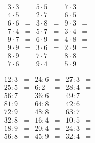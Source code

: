 \documentclass[12pt, a4paper]{article}
\begin{document}
\begin{align*}
3\cdot3 &=& 5\cdot5 &=& 7\cdot3 &=\\
4\cdot5 &=& 2\cdot7 &=& 6\cdot5 &=\\
6\cdot6 &=& 3\cdot8 &=& 9\cdot3 &=\\
7\cdot4 &=& 5\cdot7 &=& 3\cdot4 &=\\
9\cdot7 &=& 6\cdot9 &=& 4\cdot8 &=\\
9\cdot9 &=& 3\cdot6 &=& 2\cdot9 &=\\
8\cdot9 &=& 7\cdot7 &=& 8\cdot8 &=\\
7\cdot6 &=& 9\cdot4 &=& 5\cdot9 &=
\end{align*}

\begin{align*}
    12:3 &=& 24:6 &=& 27:3 &=\\
    25:5 &=& 6:2  &=& 28:4 &=\\
    56:7 &=& 36:6 &=& 49:7 &=\\
    81:9 &=& 64:8 &=& 42:6 &=\\
    72:9 &=& 48:8 &=& 63:7 &=\\
    32:8 &=& 16:4 &=& 10:5 &=\\
    18:9 &=& 20:4 &=& 24:3 &=\\
    56:8 &=& 45:9 &=& 32:4 &=
\end{align*}
\end{document}
